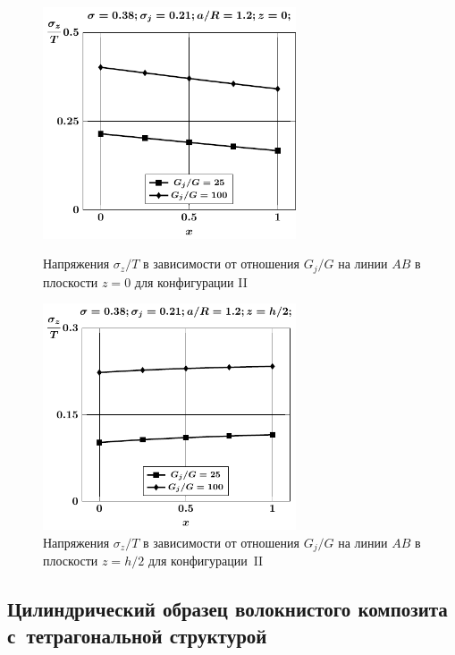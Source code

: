 \begin{russian}

\begin{figure}[h!]
\centering\footnotesize
\parbox[b]{7.5cm}{\centering\includegraphics[width=7.5cm]{inc2b-g-a12-h10-r10-z0-sig_z.pdf}
\caption{Напряжения $\sigma_z/T$ в зависимости от отношения $G_j/G$ на линии $AB$ в плоскости $z=0$ для конфигурации II
\label{f:7:110}}}\hfil\hfil
\parbox[b]{7.5cm}{\centering\includegraphics[width=7.5cm]{inc2b-g-a12-h10-r10-z1-sig_z.pdf}
\caption{Напряжения $\sigma_z/T$ в зависимости от отношения $G_j/G$ на линии $AB$ в плоскости $z=h/2$ для конфигурации~II
\label{f:7:111}}}
\end{figure}

\subsection{Цилиндрический образец волокнистого композита с~тетрагональной структурой}


\end{russian}
